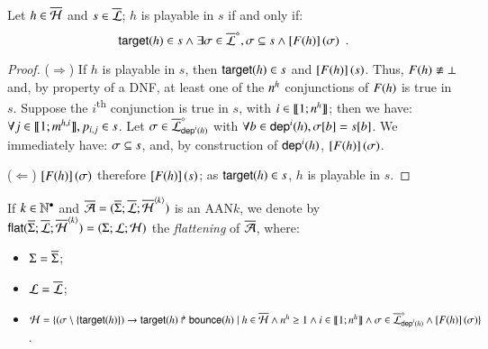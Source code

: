 \begin{lemma}
\label{lem:ppplaysubset}
  Let $h \in \overline{\mathcal{H}}$ and $s \in \overline{\mathcal{L}}$;
  $h$ is playable in $s$ if and only if:
  \[\mathsf{target}(h) \in s \wedge \exists  \sigma \in \overline{\mathcal{L}}^{\diamond},
    \sigma \subseteq s \wedge \left[F(h)\right](\sigma) \enspace.\]
\end{lemma}
%
\begin{proof}
  ($\Rightarrow$)
    If $h$ is playable in $s$, then $\mathsf{target}(h) \in s$ and $\left[F(h)\right](s)$.
    Thus, $F(h) \not\equiv \bot$ and, by property of a DNF,
    at least one of the $n^{h}$ conjunctions of $F(h)$ is true in $s$.
    Suppose the $i$\textsuperscript{th} conjunction is true in $s$, with $i \in \llbracket 1; n^{h} \rrbracket$;
    then we have: $\forall j \in \llbracket 1; m^{h,i} \rrbracket, p_{i,j} \in s$.
    Let $\sigma \in \overline{\mathcal{L}}^{\diamond}_{\mathsf{dep}^{i}(h)}$
    with $\forall b \in \mathsf{dep}^{i}(h), {\sigma[b]} = {s[b]}$.
    We immediately have: $\sigma \subseteq s$,
    and, by construction of $\mathsf{dep}^{i}(h)$, $\left[F(h)\right](\sigma)$.
  
  ($\Leftarrow$)
    $\left[F(h)\right](\sigma)$ therefore $\left[F(h)\right](s)$; as $\mathsf{target}(h) \in s$,
    $h$ is playable in $s$.
\end{proof}

\begin{definition}
  \label{def:flattening}
  If $k \in \mathbb{N}^\bullet$ and $\overline{\mathcal{A}} = (\overline{\Sigma}; \overline{\mathcal{L}}; \overline{\mathcal{H}}^{{\langle k \rangle}})$ is an AAN$k$,
  we denote by
  $\mathsf{flat}(\overline{\Sigma}; \overline{\mathcal{L}}; \overline{\mathcal{H}}^{{\langle k \rangle}}) = (\Sigma; \mathcal{L}; \mathcal{H})$
  the \emph{flattening} of $\overline{\mathcal{A}}$, where:
  \begin{itemize}
    \item $\Sigma = \overline{\Sigma}$;
    
    \item $\mathcal{L} = \overline{\mathcal{L}}$;
    
    \item $\mathcal{H} = \{
      (\sigma \setminus \{ \mathsf{target}(h) \})\rightarrow\mathsf{target}(h)\Rsh\mathsf{bounce}(h) \mid
      h \in \overline{\mathcal{H}} \wedge n^{h} \geq 1 \wedge i \in \llbracket 1; n^{h} \rrbracket \wedge
      \sigma \in \overline{\mathcal{L}}^{\diamond}_{\mathsf{dep}^{i}(h)} \wedge
      \left[F(h)\right](\sigma) \}$.
  \end{itemize}
\end{definition}

